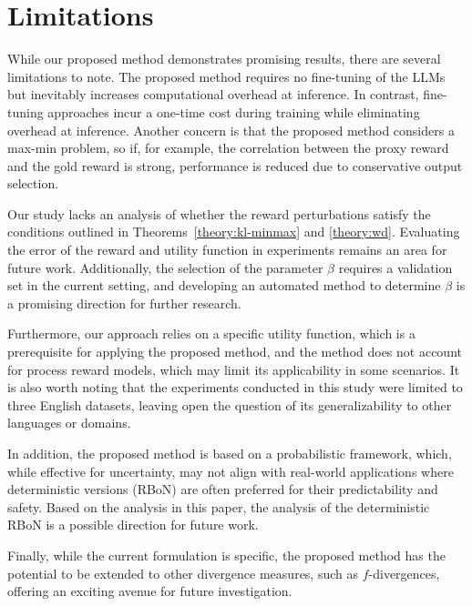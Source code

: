 
\section{Limitations}
While our proposed method demonstrates promising results, there are several limitations to note. 
The proposed method requires no fine-tuning of the LLMs but inevitably increases computational overhead at inference. In contrast, fine-tuning approaches incur a one-time cost during training while eliminating overhead at inference. Another concern is that the proposed method considers a max-min problem, so if, for example, the correlation between the proxy reward and the gold reward is strong, performance is reduced due to conservative output selection.

Our study lacks an analysis of whether the reward perturbations satisfy the conditions outlined in Theorems~\ref{theory:kl-minmax} and \ref{theory:wd}. Evaluating the error of the reward and utility function in experiments remains an area for future work. Additionally, the selection of the parameter $\beta$ requires a validation set in the current setting, and developing an automated method to determine $\beta$ is a promising direction for further research.





Furthermore, our approach relies on a specific utility function, which is a prerequisite for applying the proposed method, and the method does not account for process reward models, which may limit its applicability in some scenarios. It is also worth noting that the experiments conducted in this study were limited to three 
English datasets, leaving open the question of its generalizability to other languages or domains.

In addition, the proposed method is based on a probabilistic framework, which, while effective for uncertainty, may not align with real-world applications where deterministic versions (RBoN) are often preferred for their predictability and safety. Based on the analysis in this paper,  the analysis of the deterministic RBoN is a possible direction for future work.

Finally, while the current formulation is specific, the proposed method has the potential to be extended to other divergence measures, such as $f$-divergences, offering an exciting avenue for future investigation.